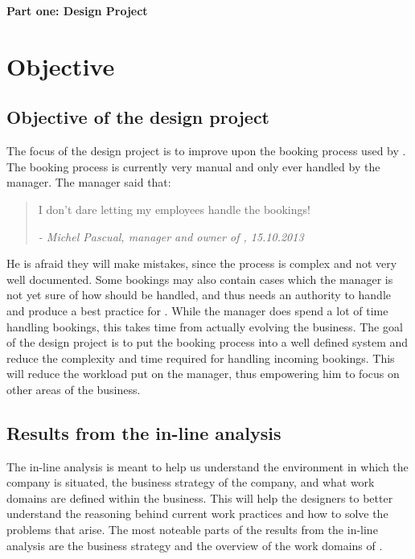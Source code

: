 \textbf{\LARGE{Part one: Design Project}}

\section{Objective}

\subsection{Objective of the design project}
The focus of the design project is to improve upon the booking process used by 
\gomonkey. The booking process is currently very manual and only ever handled by 
the manager. The manager said that: 

\begin{quotation}
I don't dare letting my employees handle the bookings!

\em - Michel Pascual, manager and owner of \gomonkey{}, 15.10.2013
\end{quotation}

He is afraid they will make mistakes, since the process is complex and not very 
well documented. Some bookings may also contain cases which the manager is not 
yet sure of how should be handled, and thus needs an authority to handle and  
produce a best practice for \gomonkey{}. While the manager does spend a lot of
time handling bookings, this takes time from actually evolving the business.
The goal of the design project is to put the booking process into a 
well defined system and reduce the complexity and time required for handling
incoming bookings. This will reduce the workload put on the manager, thus 
empowering him to focus on other areas of the business.

\subsection{Results from the in-line analysis}
The in-line analysis is meant to help us understand the environment in which 
the company is situated, the business strategy of the company, and what work
domains are defined within the business. This will help the designers to
better understand the reasoning behind current work practices and how to 
solve the problems that arise. The most noteable parts of the results from 
the in-line analysis are the business strategy and the overview of the work 
domains of \gomonkey{}.

